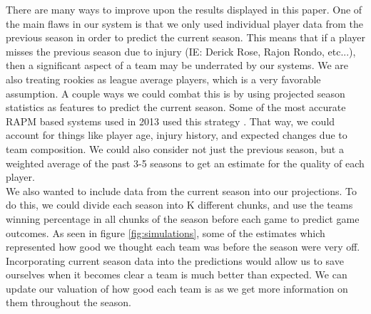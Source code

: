 \documentclass{article} %
\begin{document}
There are many ways to improve upon the results displayed in this paper. One of the main flaws in our system is that we only used individual player data from the previous season in order to predict the current season. This means that if a player misses the previous season due to injury (IE: Derick Rose, Rajon Rondo, etc...), then a significant aspect of a team may be underrated by our systems. We are also treating rookies as league average players, which is a very favorable assumption. A couple ways we could combat this is by using projected season statistics as features to predict the current season. Some of the most accurate RAPM based systems used in 2013 used this strategy \cite{projections}. That way, we could account for things like player age, injury history, and expected changes due to team composition. We could also consider not just the previous season, but a weighted average of the past 3-5 seasons to get an estimate for the quality of each player. \\

We also wanted to include data from the current season into our projections. To do this, we could divide each season into K different chunks, and use the teams winning percentage in all chunks of the season before each game to predict game outcomes. As seen in figure \ref{fig:simulations}, some of the estimates which represented how good we thought each team was before the season were very off. Incorporating current season data into the predictions would allow us to save ourselves when it becomes clear a team is much better than expected. We can update our valuation of how good each team is as we get more information on them throughout the season. 
\end{document}
